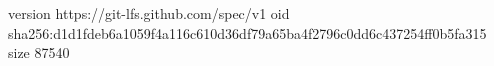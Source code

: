 version https://git-lfs.github.com/spec/v1
oid sha256:d1d1fdeb6a1059f4a116c610d36df79a65ba4f2796c0dd6c437254ff0b5fa315
size 87540
